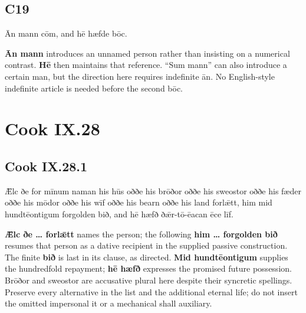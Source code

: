 \subsection*{C19}

\par\begin{minipage}{\linewidth}\raggedright
Ān mann cōm, and hē hæfde bōc.

\textbf{Ān mann} introduces an unnamed person rather than insisting on a numerical contrast. \textbf{Hē} then maintains that reference. “Sum mann” can also introduce a certain man, but the direction here requires indefinite ān. No English-style indefinite article is needed before the second bōc.

\end{minipage}\par\addvspace{4pt}

\section*{Cook IX.28}

\subsection*{Cook IX.28.1}

\par\begin{minipage}{\linewidth}\raggedright
Ǣlc ðe for mīnum naman his hūs oððe his brōðor oððe his sweostor oððe his fæder oððe his mōdor oððe his wīf oððe his bearn oððe his land forlǣtt, him mid hundtēontigum forgolden bið, and hē hæfð ðǣr-tō-ēacan ēce līf.

\textbf{Ǣlc ðe … forlǣtt} names the person; the following \textbf{him … forgolden bið} resumes that person as a dative recipient in the supplied passive construction. The finite \textbf{bið} is last in its clause, as directed. \textbf{Mid hundtēontigum} supplies the hundredfold repayment; \textbf{hē hæfð} expresses the promised future possession. Brōðor and sweostor are accusative plural here despite their syncretic spellings. Preserve every alternative in the list and the additional eternal life; do not insert the omitted impersonal it or a mechanical shall auxiliary.

\end{minipage}\par\addvspace{4pt}

